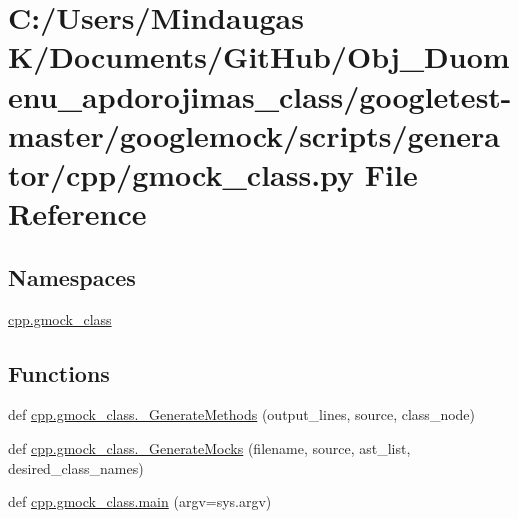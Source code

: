 \hypertarget{googletest-master_2googlemock_2scripts_2generator_2cpp_2gmock__class_8py}{}\section{C\+:/\+Users/\+Mindaugas K/\+Documents/\+Git\+Hub/\+Obj\+\_\+\+Duomenu\+\_\+apdorojimas\+\_\+class/googletest-\/master/googlemock/scripts/generator/cpp/gmock\+\_\+class.py File Reference}
\label{googletest-master_2googlemock_2scripts_2generator_2cpp_2gmock__class_8py}
\subsection*{Namespaces}
\begin{DoxyCompactItemize}
\item 
 \mbox{\hyperlink{namespacecpp_1_1gmock__class}{cpp.\+gmock\+\_\+class}}
\end{DoxyCompactItemize}
\subsection*{Functions}
\begin{DoxyCompactItemize}
\item 
def \mbox{\hyperlink{namespacecpp_1_1gmock__class_ae1b91676e6a4c7ae21c3ef2394a096a1}{cpp.\+gmock\+\_\+class.\+\_\+\+Generate\+Methods}} (output\+\_\+lines, source, class\+\_\+node)
\item 
def \mbox{\hyperlink{namespacecpp_1_1gmock__class_a3f8d5ceabb0bd6143422efeccc900ca9}{cpp.\+gmock\+\_\+class.\+\_\+\+Generate\+Mocks}} (filename, source, ast\+\_\+list, desired\+\_\+class\+\_\+names)
\item 
def \mbox{\hyperlink{namespacecpp_1_1gmock__class_a8f99cfdd2b4f0a547d6585b1de78bac0}{cpp.\+gmock\+\_\+class.\+main}} (argv=sys.\+argv)
\end{DoxyCompactItemize}
